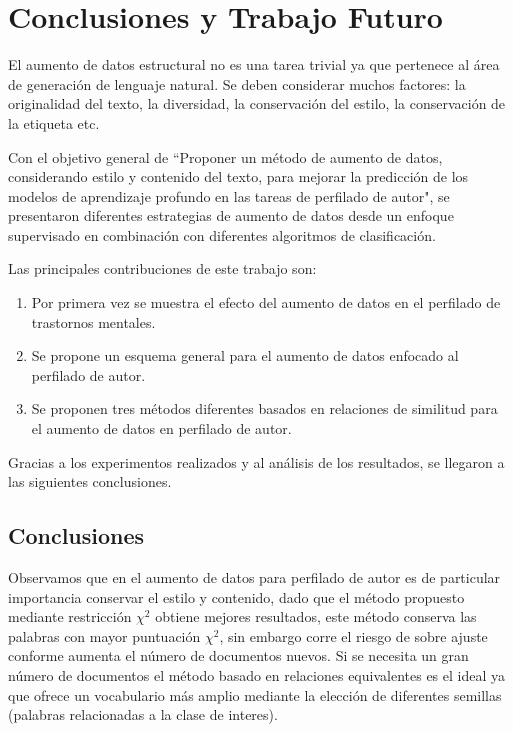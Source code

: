 
\chapter{Conclusiones y Trabajo Futuro}
El aumento de datos estructural no es una tarea trivial ya que pertenece al área de generación de lenguaje natural. Se deben considerar muchos factores: la originalidad del texto, la diversidad, la conservación del estilo, la conservación de la etiqueta etc. 

Con el objetivo general de ``Proponer  un  método  de  aumento  de  datos,  considerando  estilo  y  contenido  del texto, para mejorar la predicción de los modelos de aprendizaje profundo en las tareas de perfilado de autor", se presentaron diferentes estrategias de aumento de datos desde un enfoque supervisado en combinación con diferentes algoritmos de clasificación.

Las principales contribuciones de este trabajo son: 

\begin{enumerate}
    \item Por primera vez se muestra el efecto del aumento de datos en el perfilado de trastornos mentales.
    \item Se propone un esquema general para el aumento de datos enfocado al perfilado de autor.
    \item Se proponen tres métodos diferentes basados en relaciones de similitud para el aumento de datos en perfilado de autor.
\end{enumerate}

Gracias a los experimentos realizados y al análisis de los resultados, se llegaron a las siguientes conclusiones.

\section{Conclusiones}

Observamos que en el aumento de datos para perfilado de autor es de particular importancia conservar el estilo y contenido, dado que el método propuesto mediante restricción $\chi^2$ obtiene mejores resultados, este método conserva las palabras con mayor puntuación $\chi^2$, sin embargo corre el riesgo de sobre ajuste conforme aumenta el número de documentos nuevos. Si se necesita un gran número de documentos el método basado en relaciones equivalentes es el ideal ya que ofrece un vocabulario más amplio mediante la elección de diferentes semillas (palabras relacionadas a la clase de interes). 

